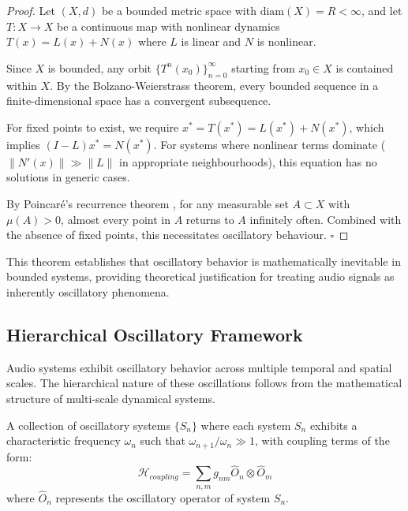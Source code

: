 \begin{proof}
Let $(X, d)$ be a bounded metric space with $\text{diam}(X) = R < \infty$, and let $T: X \to X$ be a continuous map with nonlinear dynamics $T(x) = L(x) + N(x)$ where $L$ is linear and $N$ is nonlinear.

Since $X$ is bounded, any orbit $\{T^n(x_0)\}_{n=0}^{\infty}$ starting from $x_0 \in X$ is contained within $X$. By the Bolzano-Weierstrass theorem, every bounded sequence in a finite-dimensional space has a convergent subsequence.

For fixed points to exist, we require $x^* = T(x^*) = L(x^*) + N(x^*)$, which implies $(I - L)x^* = N(x^*)$. For systems where nonlinear terms dominate ($\|N'(x)\| \gg \|L\|$ in appropriate neighbourhoods), this equation has no solutions in generic cases.

By Poincaré's recurrence theorem \cite{poincare1890probleme}, for any measurable set $A \subset X$ with $\mu(A) > 0$, almost every point in $A$ returns to $A$ infinitely often. Combined with the absence of fixed points, this necessitates oscillatory behaviour. $\square$
\end{proof}

This theorem establishes that oscillatory behavior is mathematically inevitable in bounded systems, providing theoretical justification for treating audio signals as inherently oscillatory phenomena.


\subsection{Hierarchical Oscillatory Framework}

Audio systems exhibit oscillatory behavior across multiple temporal and spatial scales. The hierarchical nature of these oscillations follows from the mathematical structure of multi-scale dynamical systems.

\begin{definition}
A collection of oscillatory systems $\{S_n\}$ where each system $S_n$ exhibits a characteristic frequency $\omega_n$ such that $\omega_{n+1}/\omega_n \gg 1$, with coupling terms of the form:
\begin{equation}
\mathcal{H}_{coupling} = \sum_{n,m} g_{nm} \hat{O}_n \otimes \hat{O}_m
\end{equation}
where $\hat{O}_n$ represents the oscillatory operator of system $S_n$.
\end{definition}

